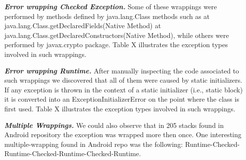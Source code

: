 \documentclass[conference]{IEEEtran}
\begin{document}
\emph{\textbf{Error wrapping Checked Exception.}} Some of these wrappings were performed by methods defined by java.lang.Class methods such as 
at java.lang.Class.getDeclaredFields(Native Method)
at java.lang.Class.getDeclaredConstructors(Native Method), 
while others were performed by javax.crypto package. Table X illustrates
the exception types involved in such wrappings.


\emph{\textbf{Error wrapping Runtime.}} After manually inspecting the code associated to such wrappings we discovered that all of them were 
caused by static initializers. If any exception is thrown in the context of a static initializer (i.e., static block) 
it is converted into an ExceptionInitializerError on the point where the class is first used. Table X illustrates
the exception types involved in such wrappings.



\emph{\textbf{Multiple Wrappings.}} We could also observe that in 205 stacks found
 in Android repository the exception was wrapped 
more then once. One interesting multiple-wrapping found in Android repo was the 
following: Runtime-Checked-Runtime-Checked-Runtime-Checked-Runtime.

\noindent {}
\end{document}
